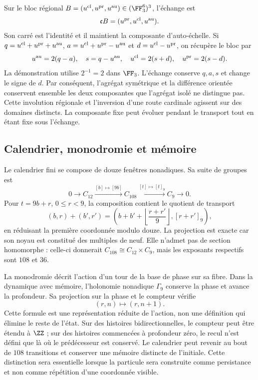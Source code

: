 Sur le bloc régional
\(B=(u^{\rm cl},u^{\rm pr},u^{\rm au})\in(\FF_3^6)^3\),
l’échange est
\[
 \mathfrak cB=(u^{\rm pr},u^{\rm cl},u^{\rm au}).
\]
Son carré est l’identité et il maintient la composante d’auto-échelle.
Si \(q=u^{\rm cl}+u^{\rm pr}+u^{\rm au}\),
\(a=u^{\rm cl}+u^{\rm pr}-u^{\rm au}\) et
\(d=u^{\rm cl}-u^{\rm pr}\), on récupère le bloc par
\[
 u^{\rm au}=2(q-a),\quad s=q-u^{\rm au},\quad
 u^{\rm cl}=2(s+d),\quad u^{\rm pr}=2(s-d).
\]
La démonstration utilise \(2^{-1}=2\) dans \(\FF_3\). L’échange
conserve \(q,a,s\) et change le signe de \(d\). Par conséquent,
l’agrégat symétrique et la différence orientée conservent ensemble
les deux composantes que l’agrégat isolé ne distingue pas.
Cette involution régionale et l’inversion d’une route cardinale
agissent sur des domaines distincts. La composante fixe peut
évoluer pendant le transport tout en étant fixe sous l’échange.

\subsection{Calendrier, monodromie et mémoire}

Le calendrier fini se compose de douze fenêtres nonadiques. Sa
suite de groupes est
\begin{equation}
 0\longrightarrow C_{12}\xrightarrow{[b]\mapsto[9b]}C_{108}
 \xrightarrow{[t]\mapsto[t]_9}C_9\longrightarrow0.
 \label{eq:extension108}
\end{equation}
Pour \(t=9b+r\), \(0\le r<9\), la composition contient
le quotient de transport
\[
 (b,r)+(b',r')=
 \left(b+b'+\left\lfloor\frac{r+r'}9\right\rfloor,
       [r+r']_9\right),
\]
en réduisant la première coordonnée modulo douze. La projection est
exacte car son noyau est constitué des multiples de neuf. Elle n’admet pas de
section homomorphe : celle-ci donnerait \(C_{108}\cong C_{12}\times C_9\),
mais les exposants respectifs sont \(108\) et \(36\).

La monodromie décrit l’action d’un tour de la base de phase
sur sa fibre. Dans la dynamique avec mémoire, l’holonomie nonadique
\(\Gamma_9\) conserve la phase et avance la profondeur. Sa
projection sur la phase et le compteur vérifie
\[
 (r,n)\longmapsto(r,n+1).
\]
Cette formule est une représentation réduite de l’action, non une
définition qui élimine le reste de l’état. Sur des histoires
bidirectionnelles, le compteur peut être étendu à \(\ZZ\) ; sur des
histoires commencées à profondeur zéro, le recul n’est
défini que là où le prédécesseur est conservé. Le calendrier peut
revenir au bout de \(108\) transitions et conserver une mémoire
distincte de l’initiale. Cette distinction sera essentielle lorsque la
particule sera construite comme persistance et non comme répétition d’une
coordonnée visible.

